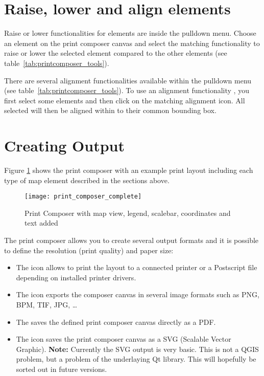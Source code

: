 \section{Raise, lower and align elements}

Raise or lower functionalities for elements are inside the
 pulldown menu. Choose an
element on the print composer canvas and select the matching functionality to
raise or lower the selected element compared to the other elements (see
table~\ref{tab:printcomposer_tools}).

There are several alignment functionalities available within the
 pulldown menu (see
table~\ref{tab:printcomposer_tools}). To use an alignment functionality , you
first select some elements and then click on the matching alignment icon. All
selected will then be aligned within to their common bounding box.

\section{Creating Output}

Figure \ref{fig:print_composer_complete} shows the print composer with an example
print layout including each type of map element described in the sections above.

\begin{figure}[h]
   \centering
   \texttt{[image: print\_composer\_complete]}
   \caption{Print Composer with map view, legend, scalebar, coordinates and text added \nixcaption} \label{fig:print_composer_complete}
\end{figure}

The print composer allows you to create several output formats and it is possible to
define the resolution (print quality) and paper size:

\begin{itemize}[label=--]
\item The  icon allows to print the layout
to a connected printer or a Postscript file depending on installed printer
drivers.
\item The  icon exports the
composer canvas in several image formats such as PNG, BPM, TIF, JPG, \dots
\item The  saves the defined
print composer canvas directly as a PDF.
\item The  icon saves the print
composer canvas as a SVG (Scalable Vector Graphic). \textbf{Note:} Currently the
SVG output is very basic. This is not a QGIS problem, but a problem of the underlaying
Qt library. This will hopefully be sorted out in future versions.
\end{itemize}

